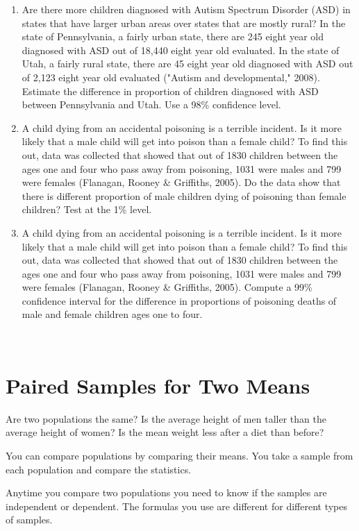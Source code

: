 \documentclass[
]{book}
\begin{document}
\begin{enumerate}
\item
  Are there more children diagnosed with Autism Spectrum Disorder (ASD) in states that have larger urban areas over states that are mostly rural? In the state of Pennsylvania, a fairly urban state, there are 245 eight year old diagnosed with ASD out of 18,440 eight year old evaluated. In the state of Utah, a fairly rural state, there are 45 eight year old diagnosed with ASD out of 2,123 eight year old evaluated ("Autism and developmental," 2008). Estimate the difference in proportion of children diagnosed with ASD between Pennsylvania and Utah. Use a 98\% confidence level.
\item
  A child dying from an accidental poisoning is a terrible incident. Is it more likely that a male child will get into poison than a female child? To find this out, data was collected that showed that out of 1830 children between the ages one and four who pass away from poisoning, 1031 were males and 799 were females (Flanagan, Rooney \& Griffiths, 2005). Do the data show that there is different proportion of male children dying of poisoning than female children? Test at the 1\% level.
\item
  A child dying from an accidental poisoning is a terrible incident. Is it more likely that a male child will get into poison than a female child? To find this out, data was collected that showed that out of 1830 children between the ages one and four who pass away from poisoning, 1031 were males and 799 were females (Flanagan, Rooney \& Griffiths, 2005). Compute a 99\% confidence interval for the difference in proportions of poisoning deaths of male and female children ages one to four.
\end{enumerate}

\textbf{\\
}

\hypertarget{paired-samples-for-two-means}{%
\section{Paired Samples for Two Means}\label{paired-samples-for-two-means}}

Are two populations the same? Is the average height of men taller than the average height of women? Is the mean weight less after a diet than before?

You can compare populations by comparing their means. You take a sample from each population and compare the statistics.

Anytime you compare two populations you need to know if the samples are independent or dependent. The formulas you use are different for different types of samples.
\end{document}
